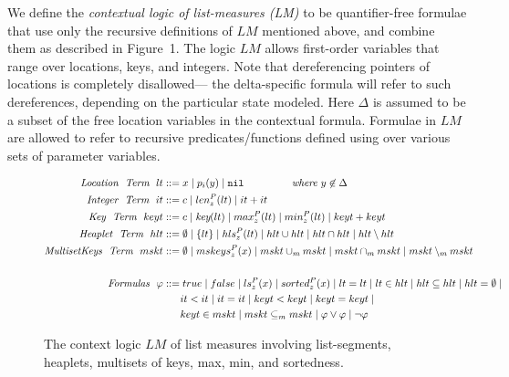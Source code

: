 
We define the \emph{contextual logic of list-measures (LM)} to be quantifier-free formulae that use only the recursive 
definitions of $LM$ mentioned above, and combine them as described in Figure~1.
The logic $LM$ allows first-order variables that range over locations, keys, and integers. Note that
dereferencing pointers of locations is completely disallowed--- the delta-specific formula will refer to such dereferences, depending on the particular state modeled.
Here $\Delta$ is assumed to be a subset of the free location variables in the contextual formula.
Formulae in $LM$ are allowed to refer to recursive predicates/functions defined using over various sets of parameter variables.


\begin{figure}
   \begin{align*}
   \textit{Location} ~~\textit{Term} ~~lt & ::=  x \mid p_i(y) \mid \texttt{nil} \hfill{\textit{~~~~~~~~~~~~~where~} y \not \in \Delta}\\
   \textit{Integer} ~~\textit{Term} ~~it & ::=  c \mid len_z^P(lt) \mid it+it \\
   \textit{Key} ~~\textit{Term} ~~keyt & ::=  c \mid \textit{key}(lt) \mid max_z^P(lt) \mid min_z^P(lt) \mid keyt+keyt \\
   \textit{Heaplet}~~ \textit{Term} ~~hlt  & ::=  \emptyset \mid \{ lt \} \mid hls_z^P(lt) \mid hlt \cup hlt \mid hlt \cap hlt \mid hlt \setminus hlt\\
   \textit{MultisetKeys}~~ \textit{Term} ~~mskt & ::= \emptyset \mid mskeys_z^P(x) \mid mskt \cup_m mskt \mid mskt \cap_m mskt \mid mskt \setminus_m mskt\\
   ~&~\\
   \textit{Formulas}~~ \varphi &  ::=  true \mid false \mid ls_z^P(x) \mid sorted_z^P(x) \mid lt = lt \mid lt \in hlt \mid hlt \subseteq hlt \mid hlt = \emptyset \mid \\
   ~& ~~~~~ it < it \mid it = it \mid keyt < keyt \mid keyt = keyt \mid \\
   ~& ~~~~~ keyt \in mskt \mid mskt \subseteq_m mskt \mid \varphi \vee \varphi \mid \neg \varphi
   \end{align*}
 \caption{The context logic $LM$ of list measures involving list-segments, heaplets, multisets of keys, max, min, and sortedness.} 
\end{figure}

